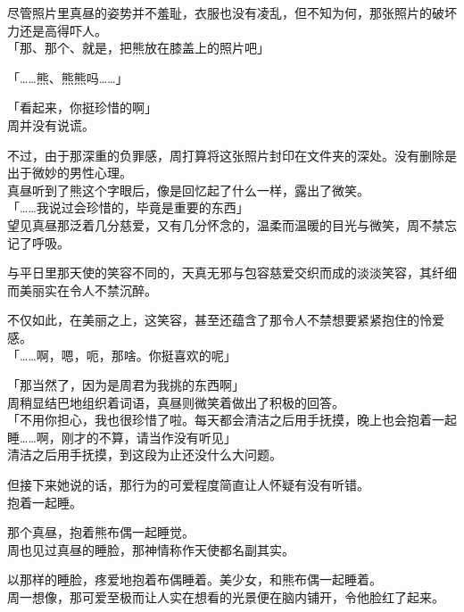 尽管照片里真昼的姿势并不羞耻，衣服也没有凌乱，但不知为何，那张照片的破坏力还是高得吓人。\\

「那、那个、就是，把熊放在膝盖上的照片吧」

「……熊、熊熊吗……」

「看起来，你挺珍惜的啊」\\

周并没有说谎。

不过，由于那深重的负罪感，周打算将这张照片封印在文件夹的深处。没有删除是出于微妙的男性心理。\\

真昼听到了熊这个字眼后，像是回忆起了什么一样，露出了微笑。\\

「……我说过会珍惜的，毕竟是重要的东西」\\

望见真昼那泛着几分慈爱，又有几分怀念的，温柔而温暖的目光与微笑，周不禁忘记了呼吸。

与平日里那天使的笑容不同的，天真无邪与包容慈爱交织而成的淡淡笑容，其纤细而美丽实在令人不禁沉醉。

不仅如此，在美丽之上，这笑容，甚至还蕴含了那令人不禁想要紧紧抱住的怜爱感。\\

「……啊，嗯，呃，那啥。你挺喜欢的呢」

「那当然了，因为是周君为我挑的东西啊」\\

周稍显结巴地组织着词语，真昼则微笑着做出了积极的回答。\\

「不用你担心，我也很珍惜了啦。每天都会清洁之后用手抚摸，晚上也会抱着一起睡……啊，刚才的不算，请当作没有听见」\\

清洁之后用手抚摸，到这段为止还没什么大问题。

但接下来她说的话，那行为的可爱程度简直让人怀疑有没有听错。\\

抱着一起睡。

那个真昼，抱着熊布偶一起睡觉。\\

周也见过真昼的睡脸，那神情称作天使都名副其实。

以那样的睡脸，疼爱地抱着布偶睡着。美少女，和熊布偶一起睡着。\\

周一想像，那可爱至极而让人实在想看的光景便在脑内铺开，令他脸红了起来。\\

